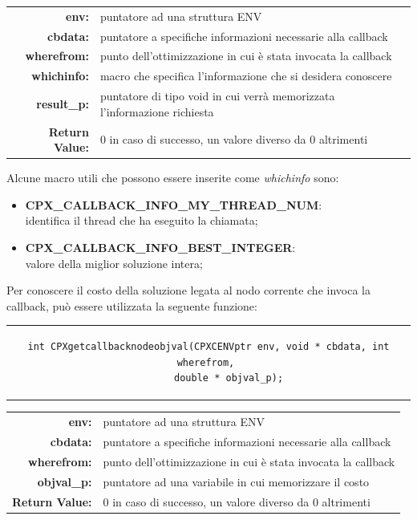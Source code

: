 \begin{table}[h]
\centering
\begin{tabular}{rl}
\textbf{env:} & {puntatore ad una struttura ENV}\\
\textbf{cbdata:} & {puntatore a specifiche informazioni necessarie alla callback}\\
\textbf{wherefrom:} & {punto dell'ottimizzazione in cui è stata invocata la callback}\\ 
\textbf{whichinfo:} & {macro che specifica l'informazione che si desidera conoscere} \\
\textbf{result\_p:} & {puntatore di tipo void in cui verrà memorizzata l'informazione richiesta}\\ 
\textbf{Return Value:} & {0 in caso di successo, un valore diverso da 0 altrimenti}\\          
\end{tabular}
\end{table}
Alcune macro utili che possono essere inserite come \textit{whichinfo} sono:
\begin{itemize}
\item{\textbf{CPX\_CALLBACK\_INFO\_MY\_THREAD\_NUM}: \\
identifica il thread che ha eseguito la chiamata;}
\item{\textbf{CPX\_CALLBACK\_INFO\_BEST\_INTEGER}: \\
valore della miglior soluzione intera;}
\end{itemize}
Per conoscere il costo della soluzione legata al nodo corrente che invoca la callback, può essere utilizzata la seguente funzione:
\begin{center}
\begin{tabular}{c}
\begin{lstlisting}[linewidth=380pt, basicstyle=\footnotesize\sffamily,] 
int CPXgetcallbacknodeobjval(CPXCENVptr env, void * cbdata, int wherefrom, 
		double * objval_p); 
\end{lstlisting}
\end{tabular}
\end{center}
\begin{table}[H]
\centering
\begin{tabular}{rl}
\textbf{env:} & {puntatore ad una struttura ENV}\\
\textbf{cbdata:} & {puntatore a specifiche informazioni necessarie alla callback}\\
\textbf{wherefrom:} & {punto dell'ottimizzazione in cui è stata invocata la callback} \\ 
\textbf{objval\_p:} & {puntatore ad una variabile in cui memorizzare il costo} \\
\textbf{Return Value:} & {0 in caso di successo, un valore diverso da 0 altrimenti}\\  
\end{tabular}
\end{table}
